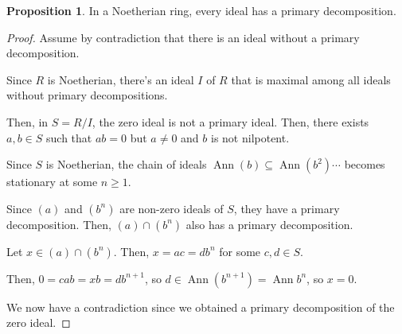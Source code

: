 \documentclass{article}
\theoremstyle{definition}
\newtheorem{proposition}[theorem]{Proposition}
\newcommand{\ann}{\operatorname{Ann}}
\begin{document}
\begin{proposition}
    In a Noetherian ring, every ideal has a primary decomposition.
\end{proposition}
\begin{proof}
    Assume by contradiction that there is an ideal without a primary decomposition.

    Since $ R $ is Noetherian, there's an ideal $ I $ of $ R $ that is maximal
    among all ideals without primary decompositions.

    Then, in $ S = R/I $, the zero ideal is not a primary ideal.
    Then, there exists $ a,b \in S $ such that $ ab = 0 $ but $ a \neq 0 $
    and $ b $ is not nilpotent.

    Since $ S $ is Noetherian, the chain of ideals $ \ann(b) \subseteq \ann(b^{2}) \cdots $
    becomes stationary at some $ n \geq 1 $.

    Since $ (a) $ and $ (b^{n}) $ are non-zero ideals of $ S $, they have a primary decomposition.
    Then, $ (a) \cap (b^{n}) $ also has a primary decomposition.

    Let $ x \in (a) \cap (b^{n}) $.
    Then, $ x = ac = db^{n} $ for some $ c,d \in S $.

    Then, $ 0 = cab = xb = db^{n + 1} $, so $ d \in \ann(b^{n + 1}) = \ann{b^{n}} $,
    so $ x = 0 $.

    We now have a contradiction since we obtained a primary decomposition of the zero ideal.
\end{proof}




\end{document}
